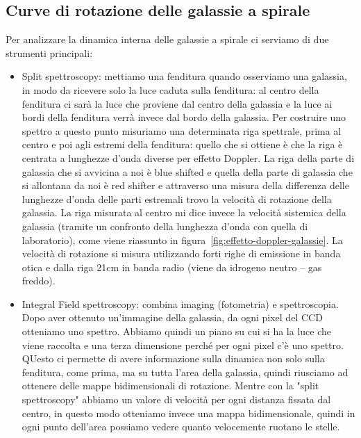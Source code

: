 \subsection{Curve di rotazione delle galassie a spirale}
Per analizzare la dinamica interna delle galassie a spirale ci serviamo di due strumenti principali:
\begin{itemize}
    \item Split spettroscopy: mettiamo una fenditura quando osserviamo una galassia, in modo da ricevere solo la luce caduta sulla fenditura: al centro della fenditura ci sarà la luce che proviene dal centro della galassia e la luce ai bordi della fenditura verrà invece dal bordo della galassia. Per costruire uno spettro a questo punto misuriamo una determinata riga spettrale, prima al centro e poi agli estremi della fenditura: quello che si ottiene è che la riga è centrata a lunghezze d’onda diverse per effetto Doppler. La riga della parte di galassia che si avvicina a noi è blue shifted e quella della parte di galassia che si allontana da noi è red shifter e attraverso una misura della differenza delle lunghezze d’onda delle parti estremali trovo la velocità di rotazione della galassia. La riga misurata al centro mi dice invece la velocità sistemica della galassia (tramite un confronto della lunghezza d’onda con quella di laboratorio), come viene riassunto in figura~\ref{fig:effetto-doppler-galassie}. La velocità di rotazione si misura utilizzando forti righe di emissione in banda otica e dalla riga 21cm in banda radio (viene da idrogeno neutro – gas freddo). 

    \item Integral Field spettroscopy: combina imaging (fotometria) e spettroscopia. Dopo aver ottenuto un’immagine della galassia, da ogni pixel del CCD otteniamo uno spettro. Abbiamo quindi un piano su cui si ha la luce che viene raccolta e una terza dimensione perché per ogni pixel c'è uno spettro. QUesto ci permette di avere informazione sulla dinamica non solo sulla fenditura, come prima, ma su tutta l’area della galassia, quindi riusciamo ad ottenere delle mappe bidimensionali di rotazione. Mentre con la "split spettroscopy" abbiamo un valore di velocità per ogni distanza fissata dal centro, in questo modo otteniamo invece una mappa bidimensionale, quindi in ogni punto dell’area possiamo vedere quanto velocemente ruotano le stelle.
\end{itemize}


